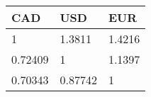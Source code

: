 \begin{tabular}{lll}
CAD & USD & EUR \\ 
\hline 
1 & 1.3811 & 1.4216 \\ 
0.72409 & 1 & 1.1397 \\ 
0.70343 & 0.87742 & 1 \\ 
\hline 
\end{tabular}